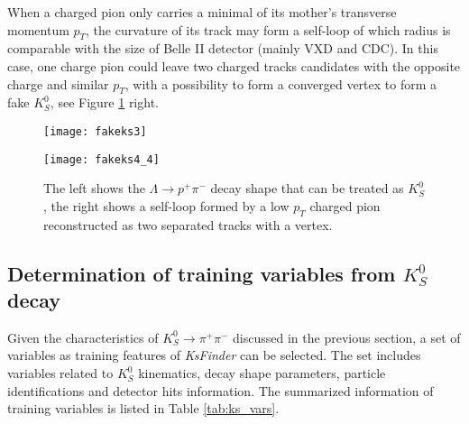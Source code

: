 When a charged pion only carries a minimal of its mother's transverse momentum $p_T$, the curvature of its track may form a self-loop of which radius is comparable with the size of Belle II detector (mainly VXD and CDC). In this case, one charge pion could leave two charged tracks candidates with the opposite charge and similar $p_T$, with a possibility to form a converged vertex to form a fake $K_S^0$, see Figure \ref{fig:fakeks2} right.

\begin{figure}[htbp]
	\begin{minipage}[t]{0.5\linewidth} %
		\centering 
		\texttt{[image: fakeks3]} 
		\label{fig:side:a} 
	\end{minipage}%
	\begin{minipage}[t]{0.5\linewidth} 
		\centering 
		\texttt{[image: fakeks4\_4]} 
		\label{fig:side:b} 
	\end{minipage}%
	
	\caption{The left shows the $\Lambda \to p^+ \pi^-$ decay shape that can be treated as $K_S^0$, the right shows a self-loop formed by a low $p_T$ charged pion reconstructed as two separated tracks with a vertex.}
	\label{fig:fakeks2}
\end{figure}

\subsection{Determination of training variables from $K_S^0$ decay }
Given the characteristics of  $K_S^0 \to \pi^+ \pi^-$ discussed in the previous section, a set of variables as training features of \textit{KsFinder} can be selected. The set includes variables related to $K_S^0$ kinematics, decay shape parameters, particle identifications and detector hits information. The summarized information of training variables is listed in Table \ref{tab:ks_vars}.

